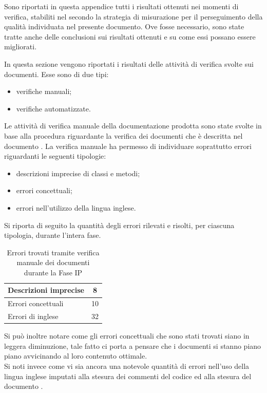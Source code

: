 	Sono riportati in questa appendice tutti i risultati ottenuti nei momenti di verifica, stabiliti nel  secondo la strategia di misurazione per il perseguimento della qualità individuata nel presente documento. Ove fosse necessario, sono state tratte anche delle conclusioni sui risultati ottenuti e su come essi possano essere migliorati.

			In questa sezione vengono riportati i risultati delle attività di verifica svolte sui documenti. Esse sono di due tipi:
			\begin{itemize}
				\item verifiche manuali;
				\item verifiche automatizzate.
			\end{itemize}
				Le attività di verifica manuale della documentazione prodotta sono state svolte in base alla procedura riguardante la verifica dei documenti che è descritta nel documento .
				La verifica manuale ha permesso di individuare soprattutto errori riguardanti le seguenti tipologie:
				\begin{itemize}
					\item descrizioni imprecise di classi e metodi;
					\item errori concettuali;
					\item errori nell'utilizzo della lingua inglese.
				\end{itemize}
				Si riporta di seguito la quantità degli errori rilevati e risolti, per ciascuna tipologia, durante l'intera fase.
				\begin{table}[H]
					\centering
						\begin{tabu}{| l | c |}
							\hline
								Descrizioni imprecise	&	8\\ \hline
								Errori concettuali	&	10\\ \hline
								Errori di inglese  &  32\\ \hline
						\end{tabu}
						\caption{Errori trovati tramite verifica manuale dei documenti durante la Fase IP}
				\end{table}
				Si può inoltre notare come gli errori concettuali che sono stati trovati siano in leggera diminuzione, tale fatto ci porta a pensare che i documenti si stanno piano piano avvicinando al loro contenuto ottimale.\\
				Si noti invece come vi sia ancora una notevole quantità di errori nell'uso della lingua inglese imputati alla stesura dei commenti del codice ed alla stesura del documento .

